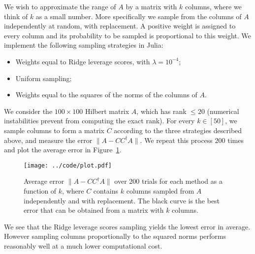 \documentclass{article}
\begin{document}
We wish to approximate the range of $A$ by a matrix with $k$ columns, where we
think of $k$ as a small number.
More specifically we sample from the columns of $A$ independently at random,
with replacement.
A positive weight is assigned to every column and its probability to be sampled
is proportional to this weight.
We implement the following sampling strategies in Julia:
\begin{itemize}
\item Weights equal to Ridge leverage scores, with $\lambda = 10^{-4}$;
\item Uniform sampling;
\item Weights equal to the squares of the norms of the columns of $A$.
\end{itemize}
We consider the $100 \times 100$ Hilbert matrix $A$, which has rank $\leq 20$
(numerical instabilities prevent from computing the exact rank).
For every $k \in [50]$, we sample columns to form a matrix $C$ according to the
three strategies described above, and measure the error $\|A - C C^\dagger A\|$.
We repeat this process $200$ times and plot the average error in
Figure~\ref{fig:stratcomp}.
\begin{figure}[h!]
  \centering
  \begin{minipage}[b]{\textwidth}
    \texttt{[image: ../code/plot.pdf]}
  \end{minipage}
  \caption{
    Average error $\|A - C C^\dagger A\|$ over $200$ trials for each method as a
    function of $k$, where $C$ contains $k$ columns sampled from $A$
    independently and with replacement.
    The black curve is the best error that can be obtained from a matrix with
    $k$ columns.
  }\label{fig:stratcomp}
\end{figure}
We see that the Ridge leverage scores sampling yields the lowest error in
average.
However sampling columns proportionally to the squared norms performs reasonably
well at a much lower computational cost.



\end{document}
